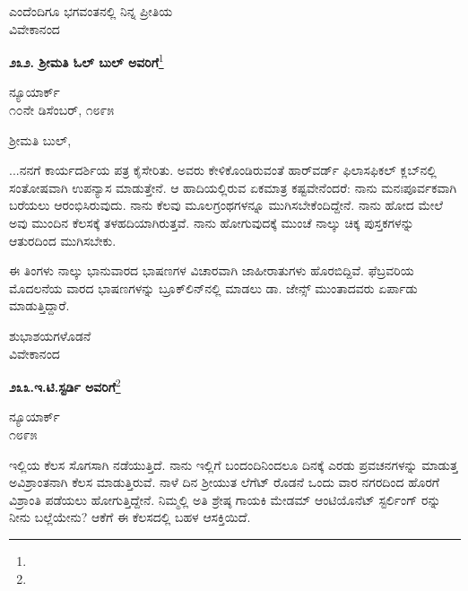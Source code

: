 {\flushright
ಎಂದೆಂದಿಗೂ ಭಗವಂತನಲ್ಲಿ ನಿನ್ನ ಪ್ರೀತಿಯ\\ವಿವೇಕಾನಂದ\par}

\begin{center}
\textbf{೨೩೨. ಶ‍್ರೀಮತಿ ಓಲ್ ಬುಲ್ ಅವರಿಗೆ}\footnote{}
\end{center}

\vspace{-0.7cm}

\begin{flushright}
ನ್ಯೂಯಾರ್ಕ್\\೧೦ನೇ ಡಿಸೆಂಬರ್, ೧೮೯೫
\end{flushright}

\vspace{-0.3cm}

\noindent
ಶ‍್ರೀಮತಿ ಬುಲ್,

...ನನಗೆ ಕಾರ್ಯದರ್ಶಿಯ ಪತ್ರ ಕೈಸೇರಿತು. ಅವರು ಕೇಳಿಕೊಂಡಿರುವಂತೆ ಹಾರ್‌ವರ್ಡ್‌ ಫಿಲಾಸಫಿಕಲ್ ಕ್ಲಬ್‌ನಲ್ಲಿ ಸಂತೋಷವಾಗಿ ಉಪನ್ಯಾಸ ಮಾಡುತ್ತೇನೆ. ಆ ಹಾದಿಯಲ್ಲಿರುವ ಏಕಮಾತ್ರ ಕಷ್ಟವೇನೆಂದರೆ: ನಾನು ಮನಃಪೂರ್ವಕವಾಗಿ ಬರೆಯಲು ಆರಂಭಿಸಿರುವುದು. ನಾನು ಕೆಲವು ಮೂಲಗ್ರಂಥಗಳನ್ನೂ ಮುಗಿಸಬೇಕೆಂದಿದ್ದೇನೆ. ನಾನು ಹೋದ ಮೇಲೆ ಅವು ಮುಂದಿನ ಕೆಲಸಕ್ಕೆ ತಳಹದಿಯಾಗಿರುತ್ತವೆ. ನಾನು ಹೋಗುವುದಕ್ಕೆ ಮುಂಚೆ ನಾಲ್ಕು ಚಿಕ್ಕ ಪುಸ್ತಕಗಳನ್ನು ಆತುರದಿಂದ ಮುಗಿಸಬೇಕು.

ಈ ತಿಂಗಳು ನಾಲ್ಕು ಭಾನುವಾರದ ಭಾಷಣಗಳ ವಿಚಾರವಾಗಿ ಜಾಹೀರಾತುಗಳು ಹೊರಬಿದ್ದಿವೆ. ಫೆಬ್ರವರಿಯ ಮೊದಲನೆಯ ವಾರದ ಭಾಷಣಗಳನ್ನು ಬ್ರೂಕ್‌ಲಿನ್‌ನಲ್ಲಿ ಮಾಡಲು ಡಾ. ಜೇನ್ಸ್ ಮುಂತಾದವರು ಏರ್ಪಾಡು ಮಾಡುತ್ತಿದ್ದಾರೆ.

\vspace{-0.3cm}

{\flushright
ಶುಭಾಶಯಗಳೊಡನೆ\\ವಿವೇಕಾನಂದ\par}

\begin{center}
\textbf{೨೩೩.ಇ.ಟಿ.ಸ್ಟರ್ಡಿ ಅವರಿಗೆ}\footnote{}
\end{center}

\vspace{-0.8cm}

\begin{flushright}
ನ್ಯೂಯಾರ್ಕ್\\೧೮೯೫
\end{flushright}

ಇಲ್ಲಿಯ ಕೆಲಸ ಸೊಗಸಾಗಿ ನಡೆಯುತ್ತಿದೆ. ನಾನು ಇಲ್ಲಿಗೆ ಬಂದಂದಿನಿಂದಲೂ ದಿನಕ್ಕೆ ಎರಡು ಪ್ರವಚನಗಳನ್ನು ಮಾಡುತ್ತ ಅವಿಶ್ರಾಂತನಾಗಿ ಕೆಲಸ ಮಾಡುತ್ತಿರುವೆ. ನಾಳೆ ದಿನ ಶ‍್ರೀಯುತ ಲೆಗೆಟ್ ರೊಡನೆ ಒಂದು ವಾರ ನಗರದಿಂದ ಹೊರಗೆ ವಿಶ್ರಾಂತಿ ಪಡೆಯಲು ಹೋಗುತ್ತಿದ್ದೇನೆ. ನಿಮ್ಮಲ್ಲಿ ಅತಿ ಶ್ರೇಷ್ಠ ಗಾಯಕಿ ಮೇಡಮ್ ಆಂಟಿಯೊನೆಟ್ ಸ್ಟರ್ಲಿಂಗ್ ರನ್ನು ನೀನು ಬಲ್ಲೆಯೇನು? ಆಕೆಗೆ ಈ ಕೆಲಸದಲ್ಲಿ ಬಹಳ ಆಸಕ್ತಿಯಿದೆ.

